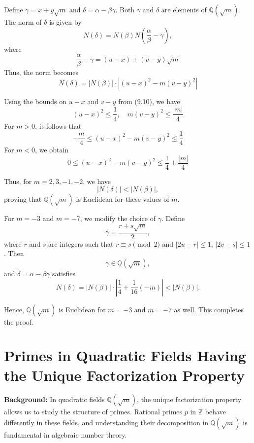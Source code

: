 \documentclass{article}
\begin{document}
Define \( \gamma = x + y\sqrt{m} \) and \( \delta = \alpha - \beta\gamma \). Both \( \gamma \) and \( \delta \) are elements of \( \mathbb{Q}(\sqrt{m}) \). The norm of \( \delta \) is given by
\[
N(\delta) = N(\beta) N\left(\frac{\alpha}{\beta} - \gamma\right),
\]
where
\[
\frac{\alpha}{\beta} - \gamma = (u - x) + (v - y)\sqrt{m}
\]
Thus, the norm becomes
\[
N(\delta) = |N(\beta)| \cdot \left| (u - x)^2 - m(v - y)^2 \right|
\]

Using the bounds on \( u - x \) and \( v - y \) from (9.10), we have
\[
(u - x)^2 \leq \frac{1}{4}, \quad m(v - y)^2 \leq \frac{|m|}{4}
\]
For \( m > 0 \), it follows that
\[
-\frac{m}{4} \leq (u - x)^2 - m(v - y)^2 \leq \frac{1}{4}
\]
For \( m < 0 \), we obtain
\[
0 \leq (u - x)^2 - m(v - y)^2 \leq \frac{1}{4} + \frac{|m|}{4}
\]

Thus, for \( m = 2, 3, -1, -2 \), we have
\[
|N(\delta)| < |N(\beta)|,
\]
proving that \( \mathbb{Q}(\sqrt{m}) \) is Euclidean for these values of \( m \).

For \( m = -3 \) and \( m = -7 \), we modify the choice of \( \gamma \). Define
\[
\gamma = \frac{r + s\sqrt{m}}{2},
\]
where \( r \) and \( s \) are integers such that \( r \equiv s \pmod{2} \) and \( |2u - r| \leq 1 \), \( |2v - s| \leq 1 \). Then
\[
\gamma \in \mathbb{Q}(\sqrt{m}),
\]
and \( \delta = \alpha - \beta\gamma \) satisfies
\[
N(\delta) = |N(\beta)| \cdot \left| \frac{1}{4} + \frac{1}{16}(-m) \right| < |N(\beta)|.
\]

Hence, \( \mathbb{Q}(\sqrt{m}) \) is Euclidean for \( m = -3 \) and \( m = -7 \) as well. This completes the proof.

\section{Primes in Quadratic Fields Having the Unique Factorization Property}

\textbf{Background:} In quadratic fields \( \mathbb{Q}(\sqrt{m}) \), the unique factorization property allows us to study the structure of primes. Rational primes \( p \) in \( \mathbb{Z} \) behave differently in these fields, and understanding their decomposition in \( \mathbb{Q}(\sqrt{m}) \) is fundamental in algebraic number theory.

\end{document}
